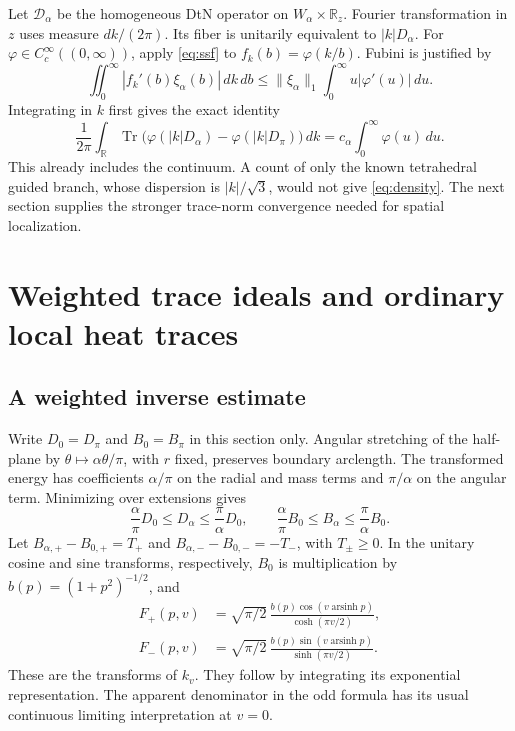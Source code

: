 \documentclass[11pt]{amsart}
\numberwithin{equation}{section}
\theoremstyle{remark}
\newcommand{\R}{\mathbb{R}}
\newcommand{\Tr}{\operatorname{Tr}}
\newcommand{\arsinh}{\operatorname{arsinh}}
\newcommand{\Dcal}{\mathcal{D}}
\begin{document}
Let $\Dcal_\alpha$ be the homogeneous DtN operator on $W_\alpha\times\R_z$. Fourier transformation in $z$ uses measure $dk/(2\pi)$. Its fiber is unitarily equivalent to $|k|D_\alpha$. For $\varphi\in C_c^\infty((0,\infty))$, apply \eqref{eq:ssf} to $f_k(b)=\varphi(k/b)$. Fubini is justified by
\begin{equation}\label{eq:fubini}
\iint_0^\infty|f_k'(b)\xi_\alpha(b)|\,dk\,db\le\|\xi_\alpha\|_1\int_0^\infty u|\varphi'(u)|\,du .
\end{equation}
Integrating in $k$ first gives the exact identity
\begin{equation}\label{eq:density}
\frac1{2\pi}\int_\R\Tr\big(\varphi(|k|D_\alpha)-\varphi(|k|D_\pi)\big)\,dk=c_\alpha\int_0^\infty\varphi(u)\,du .
\end{equation}
This already includes the continuum. A count of only the known tetrahedral guided branch, whose dispersion is $|k|/\sqrt3$, would not give \eqref{eq:density}. The next section supplies the stronger trace-norm convergence needed for spatial localization.

\section{Weighted trace ideals and ordinary local heat traces}

\subsection{A weighted inverse estimate}
Write $D_0=D_\pi$ and $B_0=B_\pi$ in this section only. Angular stretching of the half-plane by $\theta\mapsto\alpha\theta/\pi$, with $r$ fixed, preserves boundary arclength. The transformed energy has coefficients $\alpha/\pi$ on the radial and mass terms and $\pi/\alpha$ on the angular term. Minimizing over extensions gives
\begin{equation}\label{eq:stretch}
\frac\alpha\pi D_0\le D_\alpha\le\frac\pi\alpha D_0,\qquad \frac\alpha\pi B_0\le B_\alpha\le\frac\pi\alpha B_0 .
\end{equation}
Let $B_{\alpha,+}-B_{0,+}=T_+$ and $B_{\alpha,-}-B_{0,-}=-T_-$, with $T_\pm\ge0$. In the unitary cosine and sine transforms, respectively, $B_0$ is multiplication by $b(p)=(1+p^2)^{-1/2}$, and
\begin{equation}\label{eq:Fpm}
\begin{aligned}
F_+(p,v)&=\sqrt{\pi/2}\,\frac{b(p)\cos(v\arsinh p)}{\cosh(\pi v/2)},\\
F_-(p,v)&=\sqrt{\pi/2}\,\frac{b(p)\sin(v\arsinh p)}{\sinh(\pi v/2)} .
\end{aligned}
\end{equation}
These are the transforms of $k_v$. They follow by integrating its exponential representation. The apparent denominator in the odd formula has its usual continuous limiting interpretation at $v=0$.
\end{document}

